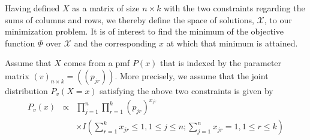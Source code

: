 \documentclass[11pt]{article}
\begin{document}
        Having defined $X$ as a matrix of size $n\times k$ with the
        two constraints regarding the sums of columns and rows, we
        thereby define the space of solutions, $\mathcal{X}$, to our minimization
        problem. It is of interest to find the minimum of the objective function $\Phi$
        over $\mathcal{X}$ and the corresponding $x$ at which that
        minimum is attained.

        Assume
        that $X$ comes from a pmf $P(x)$ that is indexed by the parameter
        matrix $(v)_{n\times k} = ((p_{jr}))$. More precisely, we assume that the joint distribution $P_v(X=x)$ satisfying the
        above two constraints is given by
        \begin{eqnarray*}
        P_v(x) &\propto & \prod_{j=1}^n
        \prod_{r=1}^k(p_{jr})^{x_{jr}} \\
                 &&\times I\left(\sum_{r=1}^k x_{jr} \le 1, 1 \le j \le n; \sum_{j=1}^n x_{jr} = 1, 1 \le r \le k\right)
        \end{eqnarray*}
\end{document}
